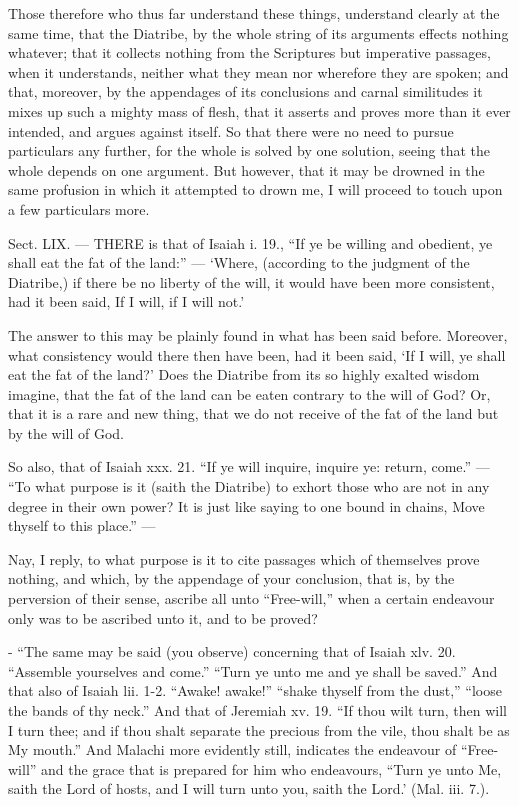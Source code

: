 Those therefore who thus far understand these things, understand clearly at the same time, that the Diatribe, by the whole string of its arguments effects nothing whatever; that it collects nothing from the Scriptures but imperative passages, when it understands, neither what they mean nor wherefore they are spoken; and that, moreover, by the appendages of its conclusions and carnal similitudes it mixes up such a mighty mass of flesh, that it asserts and proves more than it ever intended, and argues against itself. So that there were no need to pursue particulars any further, for the whole is solved by one solution, seeing that the whole depends on one argument. But however, that it may be drowned in the same profusion in which it attempted to drown me, I will proceed to touch upon a few particulars more.


Sect. LIX. — THERE is that of Isaiah i. 19., “If ye be willing and obedient, ye shall eat the fat of the land:” — ‘Where, (according to the judgment of the Diatribe,) if there be no liberty of the will, it would have been more consistent, had it been said, If I will, if I will not.’

The answer to this may be plainly found in what has been said before. Moreover, what consistency would there then have been, had it been said, ‘If I will, ye shall eat the fat of the land?’ Does the Diatribe from its so highly exalted wisdom imagine, that the fat of the land can be eaten contrary to the will of God? Or, that it is a rare and new thing, that we do not receive of the fat of the land but by the will of God.

So also, that of Isaiah xxx. 21. “If ye will inquire, inquire ye: return, come.” — “To what purpose is it (saith the Diatribe) to exhort those who are not in any degree in their own power? It is just like saying to one bound in chains, Move thyself to this place.” —

Nay, I reply, to what purpose is it to cite passages which of themselves prove nothing, and which, by the appendage of your conclusion, that is, by the perversion of their sense, ascribe all unto “Free-will,” when a certain endeavour only was to be ascribed unto it, and to be proved?

- “The same may be said (you observe) concerning that of Isaiah xlv. 20. “Assemble yourselves and come.” “Turn ye unto me and ye shall be saved.” And that also of Isaiah lii. 1-2. “Awake! awake!” “shake thyself from the dust,” “loose the bands of thy neck.” And that of Jeremiah xv. 19. “If thou wilt turn, then will I turn thee; and if thou shalt separate the precious from the vile, thou shalt be as My mouth.” And Malachi more evidently still, indicates the endeavour of “Free-will” and the grace that is prepared for him who endeavours, “Turn ye unto Me, saith the Lord of hosts, and I will turn unto you, saith the Lord.’ (Mal. iii. 7.).

